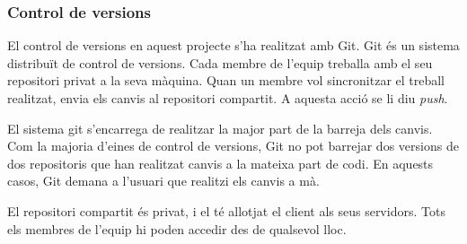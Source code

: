 

\subsubsection{Control de versions}

El control de versions en aquest projecte s'ha realitzat amb Git. Git és un sistema distribuït de control de versions. Cada membre de l'equip treballa amb el seu repositori privat a la seva màquina. Quan un membre vol sincronitzar el treball realitzat, envia els canvis al repositori compartit. A aquesta acció se li diu \textit{push}.

El sistema git s'encarrega de realitzar la major part de la barreja dels canvis. Com la majoria d'eines de control de versions, Git no pot barrejar dos versions de dos repositoris que han realitzat canvis a la mateixa part de codi. En aquests casos, Git demana a l'usuari que realitzi els canvis a mà.

El repositori compartit és privat, i el té allotjat el client als seus servidors. Tots els membres de l'equip hi poden accedir des de qualsevol lloc.